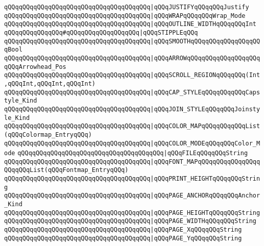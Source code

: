 \verb|qQQqqQQqqQQqqQQqqQQqqQQqqQQqqQQqqQQqqQQq|\verb#|qQQqJUSTIFYqQQqqQQqJustify#\newline
\verb|qQQqqQQqqQQqqQQqqQQqqQQqqQQqqQQqqQQqqQQq|\verb#|qQQqWRAPqQQqqQQqWrap_Mode#\newline
\verb|qQQqqQQqqQQqqQQqqQQqqQQqqQQqqQQqqQQqqQQq|\verb#|qQQqOUTLINE_WIDTHqQQqqQQqInt#\newline
\verb|qQQqqQQqqQQqqQQq#qQQqqQQqqQQqqQQqqQQq|\verb#|qQQqSTIPPLEqQQq#\newline
\verb|qQQqqQQqqQQqqQQqqQQqqQQqqQQqqQQqqQQqqQQq|\verb#|qQQqSMOOTHqQQqqQQqqQQqqQQqqQQqBool#\newline
\verb|qQQqqQQqqQQqqQQqqQQqqQQqqQQqqQQqqQQqqQQq|\verb#|qQQqARROWqQQqqQQqqQQqqQQqqQQqqQQqArrowhead_Pos#\newline
\verb|qQQqqQQqqQQqqQQqqQQqqQQqqQQqqQQqqQQqqQQq|\verb#|qQQqSCROLL_REGIONqQQqqQQq(Int,qQQqInt,qQQqInt,qQQqInt)#\newline
\verb|qQQqqQQqqQQqqQQqqQQqqQQqqQQqqQQqqQQqqQQq|\verb#|qQQqCAP_STYLEqQQqqQQqqQQqCapstyle_Kind#\newline
\verb|qQQqqQQqqQQqqQQqqQQqqQQqqQQqqQQqqQQqqQQq|\verb#|qQQqJOIN_STYLEqQQqqQQqJoinstyle_Kind#\newline
\verb|qQQqqQQqqQQqqQQqqQQqqQQqqQQqqQQqqQQqqQQq|\verb#|qQQqCOLOR_MAPqQQqqQQqqQQqList(qQQqColormap_EntryqQQq)#\newline
\verb|qQQqqQQqqQQqqQQqqQQqqQQqqQQqqQQqqQQqqQQq|\verb#|qQQqCOLOR_MODEqQQqqQQqColor_Mode#\newline
\verb|qQQqqQQqqQQqqQQqqQQqqQQqqQQqqQQqqQQqqQQq|\verb#|qQQqFILEqQQqqQQqString#\newline
\verb|qQQqqQQqqQQqqQQqqQQqqQQqqQQqqQQqqQQqqQQq|\verb#|qQQqFONT_MAPqQQqqQQqqQQqqQQqqQQqqQQqList(qQQqFontmap_EntryqQQq)#\newline
\verb|qQQqqQQqqQQqqQQqqQQqqQQqqQQqqQQqqQQqqQQq|\verb#|qQQqPRINT_HEIGHTqQQqqQQqString#\newline
\verb|qQQqqQQqqQQqqQQqqQQqqQQqqQQqqQQqqQQqqQQq|\verb#|qQQqPAGE_ANCHORqQQqqQQqAnchor_Kind#\newline
\verb|qQQqqQQqqQQqqQQqqQQqqQQqqQQqqQQqqQQqqQQq|\verb#|qQQqPAGE_HEIGHTqQQqqQQqString#\newline
\verb|qQQqqQQqqQQqqQQqqQQqqQQqqQQqqQQqqQQqqQQq|\verb#|qQQqPAGE_WIDTHqQQqqQQqString#\newline
\verb|qQQqqQQqqQQqqQQqqQQqqQQqqQQqqQQqqQQqqQQq|\verb#|qQQqPAGE_XqQQqqQQqString#\newline
\verb|qQQqqQQqqQQqqQQqqQQqqQQqqQQqqQQqqQQqqQQq|\verb#|qQQqPAGE_YqQQqqQQqString#\newline
